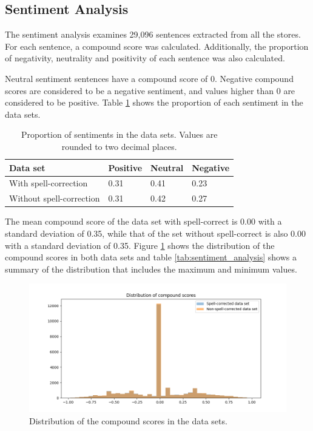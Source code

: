 \subsection{Sentiment Analysis}
\label{sec:sentiment_analysis}

The sentiment analysis examines 29,096 sentences extracted from all the stores. For each sentence, a compound score was calculated. Additionally, the proportion of negativity, neutrality and positivity of each sentence was also calculated.

Neutral sentiment sentences have a compound score of 0. Negative compound scores are considered to be a negative sentiment, and values higher than 0 are considered to be positive. Table \ref{tab:sentiment_proportion} shows the proportion of each sentiment in the data sets.

\begin{table}
    \centering
    \begin{tabular}{llll}
        \hline
        Data set & Positive & Neutral & Negative \\ \hline
        With spell-correction & 0.31 & 0.41 & 0.23 \\
        Without spell-correction & 0.31 & 0.42 & 0.27 \\
        \hline
    \end{tabular}
    \caption{Proportion of sentiments in the data sets. Values are rounded to two decimal places.}
    \label{tab:sentiment_proportion}
\end{table}

The mean compound score of the data set with spell-correct is 0.00 with a standard deviation of 0.35, while that of the set without spell-correct is also 0.00 with a standard deviation of 0.35. Figure \ref{fig:sentiment_distribution} shows the distribution of the compound scores in both data sets and table \ref{tab:sentiment_analysis} shows a summary of the distribution that includes the maximum and minimum values.

\begin{figure}[H]
    \centering
    \includegraphics[width=\textwidth]{resources/compound_scores.png}
    \caption{Distribution of the compound scores in the data sets.}
    \label{fig:sentiment_distribution}
\end{figure}


